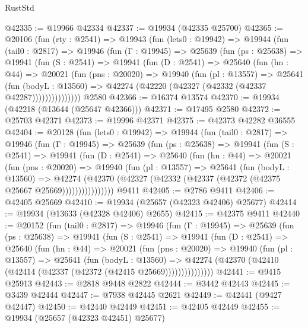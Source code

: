\begin{lexlean}{RustStd}
\begin{coremodule}
@42335 := @19966 @42334
@42337 := @19934 (@42335 @25700)
@42365 := @20106
    (fun (rty : @2541) =>
    @19943
      (fun (lets0 : @19942) =>
      @19944
        (fun (tail0 : @2817) =>
        @19946
          (fun (Γ : @19945) =>
          @25639
            (fun (ps : @25638) =>
            @19941
              (fun (S : @2541) =>
              @19941
                (fun (D : @2541) =>
                @25640
                  (fun (hn : @44) =>
                  @20021
                    (fun (pns : @20020) =>
                    @19940
                      (fun (pl : @13557) =>
                      @25641
                        (fun (bodyL : @13560) =>
                        @42274 (@42220 (@42327 (@42332 (@42337 @42287)))))))))))))))
    @2580
@42366 := @16374 @13574
@42370 := @19934 (@42218 (@13644 (@25647 @42366)))
@42371 := @17495 @2580
@42372 := @25703 @42371
@42373 := @19996 @42371
@42375 := @42373 @42282 @36555
@42404 := @20128
    (fun (lets0 : @19942) =>
    @19944
      (fun (tail0 : @2817) =>
      @19946
        (fun (Γ : @19945) =>
        @25639
          (fun (ps : @25638) =>
          @19941
            (fun (S : @2541) =>
            @19941
              (fun (D : @2541) =>
              @25640
                (fun (hn : @44) =>
                @20021
                  (fun (pns : @20020) =>
                  @19940
                    (fun (pl : @13557) =>
                    @25641
                      (fun (bodyL : @13560) =>
                      @42274
                        (@42370
                          (@42327 (@42332 (@42337 (@42372 (@42375 @25667 @25669))))))))))))))))
    @9411
@42405 := @2786 @9411
@42406 := @42405 @25669
@42410 := @19934 (@25657 (@42323 @42406) @25677)
@42414 := @19934 (@13633 (@42328 @42406) @2655)
@42415 := @42375 @9411
@42440 := @20152
    (fun (tail0 : @2817) =>
    @19946
      (fun (Γ : @19945) =>
      @25639
        (fun (ps : @25638) =>
        @19941
          (fun (S : @2541) =>
          @19941
            (fun (D : @2541) =>
            @25640
              (fun (hn : @44) =>
              @20021
                (fun (pns : @20020) =>
                @19940
                  (fun (pl : @13557) =>
                  @25641
                    (fun (bodyL : @13560) =>
                    @42274 (@42370 (@42410 (@42414 (@42337 (@42372 (@42415 @25669)))))))))))))))
@42441 := @9415 @25913
@42443 := @2818 @9448 @2822
@42444 := @3442 @42443
@42445 := @3439 @42444
@42447 := @7938 @42445 @2621
@42449 := @42441 (@9427 @42447)
@42450 := @42440 @42449
@42451 := @42405 @42449
@42455 := @19934 (@25657 (@42323 @42451) @25677)

\end{coremodule}
\end{lexlean}

